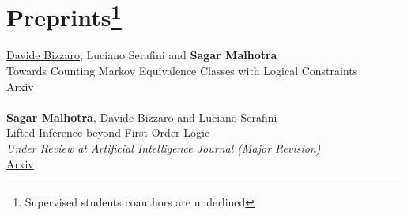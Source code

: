 \documentclass[10pt, a4paper]{article}
\newcommand{\years}[1]{\marginnote{\scriptsize #1}}
\begin{document}
\section*{Preprints\footnote[1]{Supervised students coauthors are underlined}}

\years{2024} \underline{Davide Bizzaro}, Luciano Serafini and \textbf{Sagar Malhotra}\\
Towards Counting Markov Equivalence Classes with Logical Constraints\\
\href{https://arxiv.org/abs/2405.13736}{Arxiv}\\ \\
\years{2023}\textbf{Sagar Malhotra}, \underline{Davide Bizzaro} and Luciano Serafini\\
Lifted Inference beyond First Order Logic \\
\emph{Under Review at Artificial Intelligence Journal (Major Revision)}\\
\href{https://arxiv.org/abs/2308.11738}{Arxiv}\\












\end{document}
